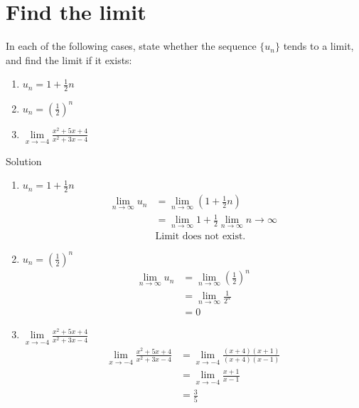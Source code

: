 \documentclass[12pt]{article}
\begin{document}
\section{Find the limit}
In each of the following cases, state whether the sequence $\{u_n\}$ tends to a limit, and find the limit if it exists:
\begin{enumerate}
    \item $u_n = 1+ \frac{1}{2}n$
    \item $u_n = \left(\frac{1}{2}\right)^n$
    \item $\lim\limits_{x \to -4} \frac{x^2 + 5x + 4}{x^2 + 3x -4}$
\end{enumerate}
Solution

\begin{enumerate}
    \item $u_n = 1+ \frac{1}{2}n$
    \begin{align*}
        \lim\limits_{n \to \infty} u_n &=  \lim\limits_{n \to \infty}(1 + \frac{1}{2}n) 
        \\ &=  \lim\limits_{n \to \infty} 1 +  \frac{1}{2}\lim\limits_{n \to \infty} n \to \infty 
        \\ & \text{Limit does not exist.}
    \end{align*}
    \item $u_n = \left(\frac{1}{2}\right)^n$
    \begin{align*}
         \lim\limits_{n \to \infty} u_n &=  \lim\limits_{n \to \infty} \left(\frac{1}{2}\right)^n 
         \\ &= \lim\limits_{n \to \infty} \frac{1}{2^n} 
         \\ &=0
    \end{align*}
    \item $\lim\limits_{x \to -4} \frac{x^2 + 5x + 4}{x^2 + 3x -4}$
    \begin{align*}
        \lim\limits_{x \to -4} \frac{x^2 + 5x + 4}{x^2 + 3x -4}   &= \lim\limits_{x \to -4} \frac{(x+4)(x+1)}{(x+4)(x-1)}
        \\ &= \lim\limits_{x \to -4} \frac{x+1}{x-1}
        \\ &= \frac{3}{5}
    \end{align*}
\end{enumerate}
\end{document}
